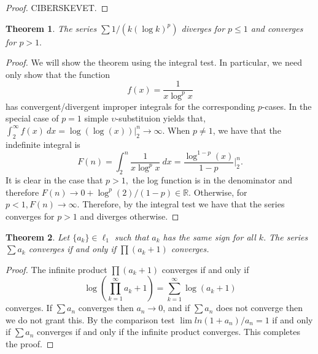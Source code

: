 \documentclass[letter]{article}
\newtheorem{theorem}{Theorem}
\newenvironment{menumerate}{%
  \edef\backupindent{\the\parindent}%
  \enumerate%
  \setlength{\parindent}{\backupindent}%
}{\endenumerate}
\begin{document}
\begin{menumerate}
\begin{proof}
		CIBERSKEVET.  
		\end{proof}

		\item \begin{theorem}
			The series $\sum 1/(k(\log k)^p)$ diverges for $p \leq 1$ and converges for $p > 1.$
		\end{theorem}
		\begin{proof}
		 We will show the theorem using the integral test. In particular, we need only show that the function $$f(x) = \frac{1}{x\log^px}$$ has convergent/divergent improper integrals for the corresponding $p$-cases. In the special case of $p = 1$ simple $\upsilon$-substituion yields that, $\int_2^\infty f(x)\ dx =  \log(\log(x))|_2^n \to \infty.$ When $p \neq 1$, we have that the indefinite integral is $$F(n) = \int_2^n \frac{1}{x\log^px}\ dx = \frac{\log^{1-p}(x)}{1-p}\Bigg|_2^n.$$ It is clear in the  case that $p>1,$ the log function is in the denominator and therefore $F(n) \to 0 + \log^p(2)/(1-p) \in \mathbb{R}.$ Otherwise, for $p < 1, F(n) \to \infty.$ Therefore, by the integral test we have that the series converges for $p >1$ and diverges otherwise.
		\end{proof}

		\setcounter{enumi}{66}
		\item
		\begin{theorem}
			Let $\{a_k\} \in \ell_1$ such that $a_k$ has the same sign for all $k.$
			The series $\sum a_k$ converges if and only if $\prod (a_k +1)$ converges.
		\end{theorem}
		\begin{proof}
			The infinite product $\prod (a_k +1)$ converges if and only if $$\log\left(\prod_{k =1}^\infty a_k +1\right) = \sum_{k=1}^\infty \log(a_k+1)$$ converges. If $\sum a_n $ converges then $a_n \to 0$, and if $\sum a_n$ does not converge then we do not grant this. By the comparison test $\lim ln(1+a_n)/a_n = 1$ if and only if $\sum a_n$ converges if and only if the infinite product converges. This completes the proof.  
		\end{proof}

		\item %
		\item %
		\item %
	\end{menumerate}
\end{document}
